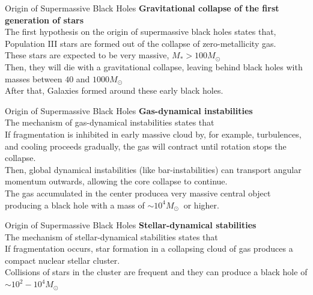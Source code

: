 \documentclass{beamer}
\begin{document}
\begin{frame}{Origin of Supermassive Black Holes}
	\textbf{Gravitational collapse of the first generation of stars}\\
	
	The first hypothesis on the origin of supermassive black holes states that,\\
	\bigskip
	\onslide<1-> Population III stars are formed out of the collapse of zero-metallicity gas.\\
	\pause
	\bigskip
	\onslide<2-> These stars are expected to be very massive, $M_* > 100 M_\odot\ $\\
	\pause
	\bigskip
	\onslide<3-> Then, they will die with a gravitational collapse, leaving behind black holes with masses between $40$ and $1000 M_\odot\ $ \\
	\pause
	\bigskip
	\onslide<4-> After that, Galaxies formed around these early black holes.
\end{frame}

\begin{frame}{Origin of Supermassive Black Holes}
	\textbf{Gas-dynamical instabilities}\\

	The mechanism of gas-dynamical instabilities states that\\
	\pause
	\bigskip
	\onslide<2-> If fragmentation is inhibited in early massive cloud by, for example, turbulences, and cooling proceeds gradually, the gas will contract until rotation stops the collapse.\\ 
	\pause
	\bigskip
	\onslide<3-> Then, global dynamical instabilities (like bar-instabilities) can transport angular momentum outwards, allowing the core collapse to continue.\\ 
	\pause
	\bigskip
	\onslide<4-> The gas accumulated in the center producea very massive central object producing a black hole with a mass of $ \sim 10^4 M_\odot\ $ or higher.
\end{frame}

\begin{frame}{Origin of Supermassive Black Holes}
	\textbf{Stellar-dynamical stabilities}\\
	
	The mechanism of stellar-dynamical stabilities states that\\
	\pause
	\bigskip
	\onslide<2-> If fragmentation occurs, star formation in a collapsing cloud of gas produces a compact nuclear stellar cluster.\\ 
	\pause
	\bigskip
	\onslide<3-> Collisions of stars in the cluster are frequent and they can produce a black hole of $ \sim 10^2 - 10^4 M_\odot\ $ \\ 
\end{frame}
\end{document}
